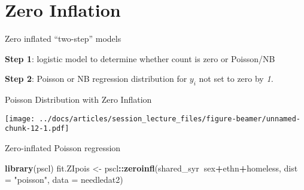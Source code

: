 \documentclass[
  ignorenonframetext,
]{beamer}
\newenvironment{Shaded}{\begin{snugshade}}{\end{snugshade}}
\newcommand{\DataTypeTok}[1]{\textcolor[rgb]{0.13,0.29,0.53}{#1}}
\newcommand{\KeywordTok}[1]{\textcolor[rgb]{0.13,0.29,0.53}{\textbf{#1}}}
\newcommand{\NormalTok}[1]{#1}
\newcommand{\OperatorTok}[1]{\textcolor[rgb]{0.81,0.36,0.00}{\textbf{#1}}}
\newcommand{\StringTok}[1]{\textcolor[rgb]{0.31,0.60,0.02}{#1}}
\begin{document}
\hypertarget{zero-inflation}{%
\section{Zero Inflation}\label{zero-inflation}}

\begin{frame}{Zero inflated ``two-step'' models}
\protect\hypertarget{zero-inflated-two-step-models}{}

\textbf{Step 1}: logistic model to determine whether count is zero or
Poisson/NB

\textbf{Step 2}: Poisson or NB regression distribution for \(y_i\) not
set to zero by \emph{1.}

\end{frame}

\begin{frame}{Poisson Distribution with Zero Inflation}
\protect\hypertarget{poisson-distribution-with-zero-inflation}{}

\texttt{[image: ../docs/articles/session\_lecture\_files/figure-beamer/unnamed-chunk-12-1.pdf]}

\end{frame}

\begin{frame}[fragile]{Zero-inflated Poisson regression}
\protect\hypertarget{zero-inflated-poisson-regression}{}

\begin{Shaded}
\begin{Highlighting}[]
\KeywordTok{library}\NormalTok{(pscl)}
\NormalTok{fit.ZIpois <-}
\StringTok{  }\NormalTok{pscl}\OperatorTok{::}\KeywordTok{zeroinfl}\NormalTok{(shared_syr}\OperatorTok{~}\NormalTok{sex}\OperatorTok{+}\NormalTok{ethn}\OperatorTok{+}\NormalTok{homeless,}
                 \DataTypeTok{dist =} \StringTok{"poisson"}\NormalTok{,}
                 \DataTypeTok{data =}\NormalTok{ needledat2)}
\end{Highlighting}
\end{Shaded}

\end{frame}
\end{document}
